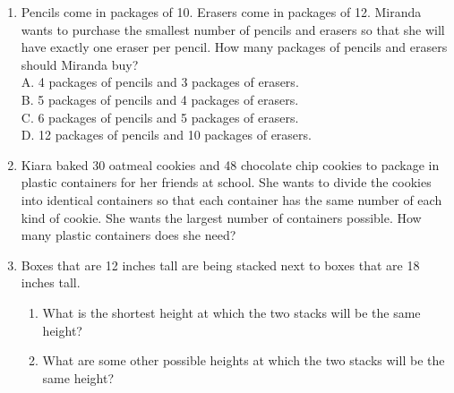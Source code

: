 \documentclass[a4paper,12pt]{article}
\begin{document}
\begin{tcolorbox}[colback=red!0!white, colframe=gray ,title=\subsection{Set Two}\label{SetTwo}]
\begin{enumerate}
	\item Pencils come in packages of 10. Erasers come in packages of 12. Miranda wants to purchase the smallest number of pencils and erasers so that she will have exactly one eraser per pencil. How many packages of pencils and erasers should Miranda buy?\\
	A. 4 packages of pencils and 3 packages of erasers.\\
	B. 5 packages of pencils and 4 packages of erasers.\\
	C. 6 packages of pencils and 5 packages of erasers.\\
	D. 12 packages of pencils and 10 packages of erasers.
	\item Kiara baked 30 oatmeal cookies and 48 chocolate chip cookies to package in plastic containers for her friends at school. She wants to divide the cookies into identical containers so that each container has the same number of each kind of cookie. She wants the largest number of containers possible. How many plastic containers does she need?
	\item Boxes that are 12 inches tall are being stacked next to boxes that are 18 inches tall.
	\begin{enumerate}
		\item What is the shortest height at which the two stacks will be the same height?
	    \item What are some other possible heights at which the two stacks will be the same height?
	\end{enumerate}
\end{enumerate}
\end{tcolorbox}
\end{document}
